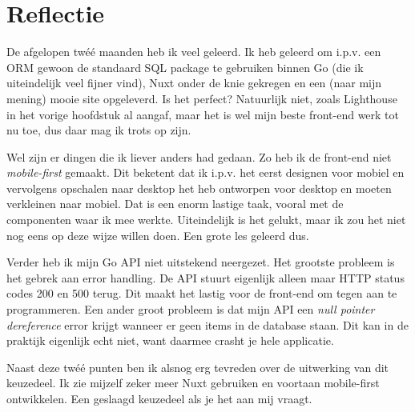 \documentclass[a4paper]{report}
\begin{document}
    \chapter{Reflectie}
    De afgelopen twéé maanden heb ik veel geleerd. Ik heb geleerd om i.p.v. een ORM gewoon de standaard SQL package te gebruiken binnen Go (die ik uiteindelijk veel fijner vind),
    Nuxt onder de knie gekregen en een (naar mijn mening) mooie site opgeleverd. Is het perfect? Natuurlijk niet, zoals Lighthouse in het vorige hoofdstuk al aangaf, maar het is
    wel mijn beste front-end werk tot nu toe, dus daar mag ik trots op zijn.

    Wel zijn er dingen die ik liever anders had gedaan. Zo heb ik de front-end niet \textit{mobile-first} gemaakt. Dit beketent dat ik i.p.v. het eerst designen voor mobiel en vervolgens
    opschalen naar desktop het heb ontworpen voor desktop en moeten verkleinen naar mobiel. Dat is een enorm lastige taak, vooral met de componenten waar ik mee werkte.
    Uiteindelijk is het gelukt, maar ik zou het niet nog eens op deze wijze willen doen. Een grote les geleerd dus.

    Verder heb ik mijn Go API niet uitstekend neergezet. Het grootste probleem is het gebrek aan error handling. De API stuurt eigenlijk alleen maar HTTP status codes 200 en 500 terug.
    Dit maakt het lastig voor de front-end om tegen aan te programmeren. Een ander groot probleem is dat mijn API een \textit{null pointer dereference} error krijgt wanneer er geen
    items in de database staan. Dit kan in de praktijk eigenlijk echt niet, want daarmee crasht je hele applicatie.

    Naast deze twéé punten ben ik alsnog erg tevreden over de uitwerking van dit keuzedeel. Ik zie mijzelf zeker meer Nuxt gebruiken en voortaan mobile-first ontwikkelen.
    Een geslaagd keuzedeel als je het aan mij vraagt.

    \printbibliography
\end{document}
